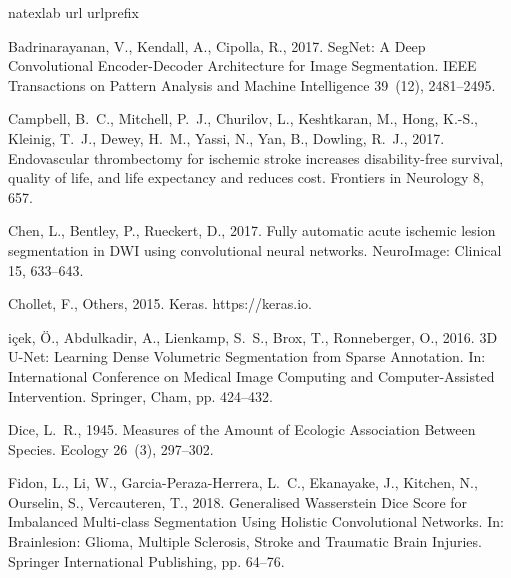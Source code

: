 \documentclass[letterpaper,final,authoryear,3p,times,twocolumn]{elsarticle}
\begin{document}


\begin{thebibliography}{36}
\expandafter\ifx\csname natexlab\endcsname\relax\def\natexlab#1{#1}\fi
\expandafter\ifx\csname url\endcsname\relax
  \def\url#1{\texttt{#1}}\fi
\expandafter\ifx\csname urlprefix\endcsname\relax\def\urlprefix{URL }\fi

Badrinarayanan, V., Kendall, A., Cipolla, R., 2017. {SegNet: A Deep
  Convolutional Encoder-Decoder Architecture for Image Segmentation}. IEEE
  Transactions on Pattern Analysis and Machine Intelligence 39~(12),
  2481--2495.

Campbell, B.~C., Mitchell, P.~J., Churilov, L., Keshtkaran, M., Hong, K.-S.,
  Kleinig, T.~J., Dewey, H.~M., Yassi, N., Yan, B., Dowling, R.~J., 2017.
  {Endovascular thrombectomy for ischemic stroke increases disability-free
  survival, quality of life, and life expectancy and reduces cost}. Frontiers
  in Neurology 8, 657.

Chen, L., Bentley, P., Rueckert, D., 2017. {Fully automatic acute ischemic
  lesion segmentation in DWI using convolutional neural networks}. NeuroImage:
  Clinical 15, 633--643.

Chollet, F., Others, 2015. {Keras}. https://keras.io.

i{\c{c}}ek, {\"{O}}., Abdulkadir, A., Lienkamp, S.~S., Brox, T.,
  Ronneberger, O., 2016. {3D U-Net: Learning Dense Volumetric Segmentation from
  Sparse Annotation}. In: International Conference on Medical Image Computing
  and Computer-Assisted Intervention. Springer, Cham, pp. 424--432.

Dice, L.~R., 1945. {Measures of the Amount of Ecologic Association Between
  Species}. Ecology 26~(3), 297--302.

Fidon, L., Li, W., Garcia-Peraza-Herrera, L.~C., Ekanayake, J., Kitchen, N.,
  Ourselin, S., Vercauteren, T., 2018. {Generalised Wasserstein Dice Score for
  Imbalanced Multi-class Segmentation Using Holistic Convolutional Networks}.
  In: Brainlesion: Glioma, Multiple Sclerosis, Stroke and Traumatic Brain
  Injuries. Springer International Publishing, pp. 64--76.


\end{thebibliography}
\end{document}
